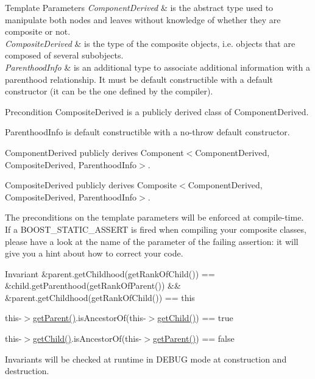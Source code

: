 \begin{DoxyTemplParams}{Template Parameters}
{\em Component\+Derived} & is the abstract type used to manipulate both nodes and leaves without knowledge of whether they are composite or not. \\
\hline
{\em Composite\+Derived} & is the type of the composite objects, i.\+e. objects that are composed of several subobjects. \\
\hline
{\em Parenthood\+Info} & is an additional type to associate additional information with a parenthood relationship. It must be default constructible with a default constructor (it can be the one defined by the compiler).\\
\hline
\end{DoxyTemplParams}
\begin{DoxyPrecond}{Precondition}
Composite\+Derived is a publicly derived class of Component\+Derived. 

Parenthood\+Info is default constructible with a no-\/throw default constructor. 

Component\+Derived publicly derives Component$<$\+Component\+Derived, Composite\+Derived, Parenthood\+Info$>$. 

Composite\+Derived publicly derives Composite$<$\+Component\+Derived, Composite\+Derived, Parenthood\+Info$>$.
\end{DoxyPrecond}
The preconditions on the template parameters will be enforced at compile-\/time. If a B\+O\+O\+S\+T\+\_\+\+S\+T\+A\+T\+I\+C\+\_\+\+A\+S\+S\+E\+RT is fired when compiling your composite classes, please have a look at the name of the parameter of the failing assertion\+: it will give you a hint about how to correct your code.

\begin{DoxyInvariant}{Invariant}
\&parent.\+get\+Childhood(get\+Rank\+Of\+Child()) == \&child.\+get\+Parenthood(get\+Rank\+Of\+Parent()) \&\& \&parent.\+get\+Childhood(get\+Rank\+Of\+Child()) == this 

this-\/$>$\hyperlink{classocra_1_1Parenthood_ac7e617fc08d7bed72fc6f90579b5cef7}{get\+Parent()}.is\+Ancestor\+Of(this-\/$>$\hyperlink{classocra_1_1Parenthood_a7056661e3f0e6500141d305e6397f7c0}{get\+Child()}) == true 

this-\/$>$\hyperlink{classocra_1_1Parenthood_a7056661e3f0e6500141d305e6397f7c0}{get\+Child()}.is\+Ancestor\+Of(this-\/$>$\hyperlink{classocra_1_1Parenthood_ac7e617fc08d7bed72fc6f90579b5cef7}{get\+Parent()}) == false
\end{DoxyInvariant}
Invariants will be checked at runtime in D\+E\+B\+UG mode at construction and destruction. 

